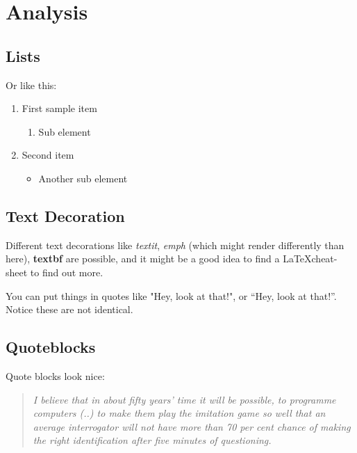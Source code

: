 \documentclass[a4paper, twocolumn]{article}
\begin{document}
\section{Analysis}



\subsection{Lists}
\label{sec:Lists}



Or like this:

\begin{enumerate}
    \item First sample item
        \begin{enumerate}
            \item Sub element
        \end{enumerate}
    \item Second item
        \begin{itemize}
            \item Another sub element
        \end{itemize}
\end{enumerate}


\subsection{Text Decoration\label{sec:Text Decoration}}


Different text decorations like \textit{textit}, \emph{emph} (which might render differently than here), \textbf{textbf} are possible, and it might be a good idea to find a \LaTeX cheat-sheet to find out more.

You can put things in quotes like "Hey, look at that!", or ``Hey, look at that!''.
Notice these are not identical.


\subsection{Quoteblocks\label{sec:Quoteblock}}

Quote blocks look nice:

\begin{quote}
\emph{
I believe that in about fifty years' time it will be possible, to programme computers (..) to make them play the imitation game so well that an average interrogator will not have more than 70 per cent chance of making the right identification after five minutes of questioning.
}
\cite{turing1950computing}
\end{quote}
\end{document}

